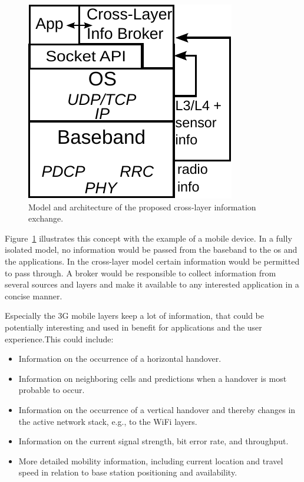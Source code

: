 \begin{figure}[htb]
	\centering
	\includegraphics{images/cross-layer-model.pdf}
	\caption{Model and architecture of the proposed cross-layer information exchange.}
\label{c5:fig:crosslayer-model}
\end{figure}

Figure~\ref{c5:fig:crosslayer-model} illustrates this concept with the example of a mobile device. In a fully isolated model, no information would be passed from the baseband to the \gls{os} and the applications. In the cross-layer model certain information would be permitted to pass through. A broker would be responsible to collect information from several sources and layers and make it available to any interested application in a concise manner.

Especially the \gls{3G} mobile layers keep a lot of information, that could be potentially interesting and used in benefit for applications and the user experience.This could include:

\begin{itemize}
	\item Information on the occurrence of a horizontal handover.
	\item Information on neighboring cells and predictions when a handover is most probable to occur.
	\item Information on the occurrence of a vertical handover and thereby changes in the active network stack, e.g., to the WiFi layers.
	\item Information on the current signal strength, bit error rate, and throughput.
	\item More detailed mobility information, including current location and travel speed in relation to base station positioning and availability.
\end{itemize}

